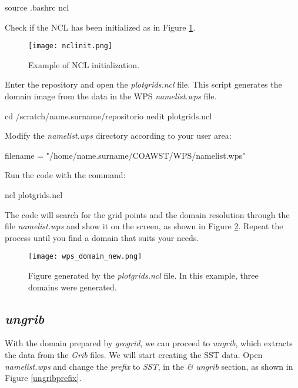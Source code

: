 \begin{bashcode}
source .bashrc
ncl
\end{bashcode}
\bigskip

\noindent Check if the NCL has been initialized as in Figure \ref{nclinit}.
\bigskip

\begin{figure}[H]
    \centering
    \texttt{[image: nclinit.png]}
    \caption{Example of NCL initialization.}
    \label{nclinit}
\end{figure}
\bigskip


\noindent Enter the repository and open the \textit{plotgrids.ncl} file. 
This script generates the domain image from the data in the WPS \textit{namelist.wps} file.
\bigskip

\begin{bashcode}
cd /scratch/name.surname/repositorio
nedit plotgrids.ncl
\end{bashcode}
\bigskip

\noindent Modify the \textit{namelist.wps} directory according to your user area:
\bigskip

\begin{bashcode}
filename = "/home/name.surname/COAWST/WPS/namelist.wps"
\end{bashcode}
\bigskip

\noindent Run the code with the command:
\bigskip

\begin{bashcode}
ncl plotgrids.ncl
\end{bashcode}
\bigskip

\noindent The code will search for the grid points and the domain resolution through the file \textit{namelist.wps} and show it on the screen, 
as shown in Figure \textcolor{bleu_cite}{\ref{nclgrids}}. Repeat the process until you find a domain that suits your needs.
\bigskip

\begin{figure}[H]
    \centering
    \texttt{[image: wps\_domain\_new.png]}
    \caption{Figure generated by the \textit{plotgrids.ncl} file. In this example, three domains were generated.}
    \label{nclgrids}
\end{figure}
\bigskip

\subsection{\textit{ungrib}}\label{ungribsecao}
\bigskip
\noindent With the domain prepared by \textit{geogrid}, we can proceed to \textit{ungrib}, which extracts the data from the
 \textit {Grib} files. We will start creating the SST data. Open \textit{namelist.wps}
and  change the \textit{prefix} to \textit{SST}, in the \textit{\& ungrib} section, as shown in Figure \ref{ungribprefix}.
\bigskip

